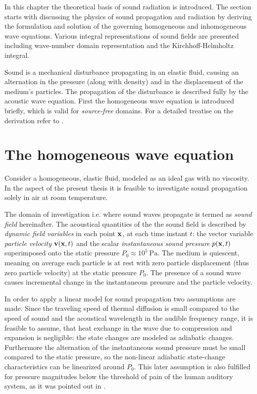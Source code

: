 In this chapter the theoretical basis of sound radiation is introduced. The section starts with discussing the physics of sound propagation and radiation by deriving the formulation and solution of the governing homogeneous and inhomogeneous wave equations. Various integral representations of sound fields are presented including wave-number domain representation and the Kirchhoff-Helmholtz integral.
%

\vspace{3mm}
Sound is a mechanical disturbance propagating in an elastic fluid, causing an alternation in the pressure (along with density) and in the displacement of the medium's particles. The propagation of the disturbance is described fully by the acoustic wave equation. First the homogeneous wave equation is introduced briefly, which is valid for \emph{source-free} domains. For a detailed treatise on the derivation refer to \cite{Beranek1993, Morse1968, Williams1999, Blackstock2000}.

\section{The homogeneous wave equation}

Consider a homogeneous, elastic fluid, modeled as an ideal gas with no viscosity. In the aspect of the present thesis it is feasible to investigate sound propagation solely in air at room temperature.

%
The domain of investigation i.e. where sound waves propagate is termed as \emph{sound field} hereinafter.
The acoustical quantities of the the sound field is described by \emph{dynamic field variables} in each point $\mathbf{x}$, at each time instant $t$: the vector variable \emph{particle velocity} $\mathbf{v}(\mathbf{x},t)$ and the scalar \emph{instantaneous sound pressure} $p(\mathbf{x},t)$ superimposed onto the static pressure $P_0 \approx 10^5~\mathrm{Pa}$.
The medium is quiescent, meaning on average each particle is at rest with zero particle displacement (thus zero particle velocity) at the static pressure $P_0$. 
The presence of a sound wave causes incremental change in the instantaneous pressure and the particle velocity.
%

In order to apply a linear model for sound propagation two assumptions are made.
Since the traveling speed of thermal diffusion is small compared to the speed of sound and the acoustical wavelength in the audible frequency range, it is feasible to assume, that heat exchange in the wave due to compression and expansion is negligible: the state changes are modeled as adiabatic changes.
Furthermore the alternation of the instantaneous sound pressure must be small compared to the static pressure, so the non-linear adiabatic state-change characteristics can be linearized around $P_0$. This later assumption is also fulfilled for pressure magnitudes below the threshold of pain of the human auditory system, as it was pointed out in \cite{Gumerov2004, Ahrens2012}.
%


